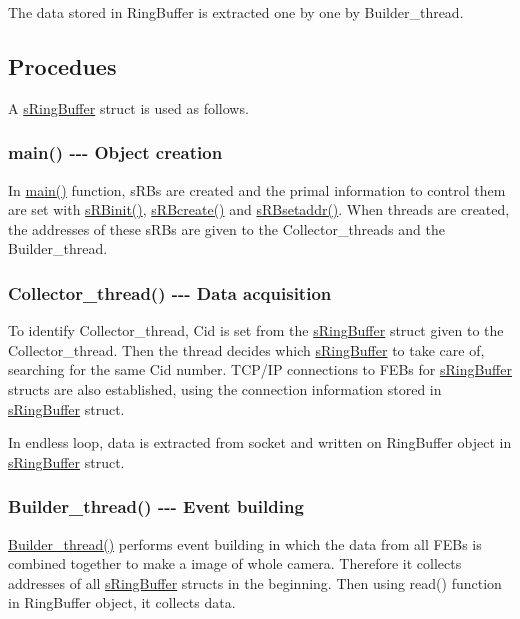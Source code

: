 The data stored in Ring\+Buffer is extracted one by one by Builder\+\_\+thread.\hypertarget{structsRingBuffer_SRB_PROC}{}\subsection{Procedues}\label{structsRingBuffer_SRB_PROC}
A \hyperlink{structsRingBuffer}{s\+Ring\+Buffer} struct is used as follows.\hypertarget{structsRingBuffer_SRB_CREATION}{}\subsubsection{main() -\/-\/-\/ Object creation}\label{structsRingBuffer_SRB_CREATION}
In \hyperlink{Master_8cpp_a3c04138a5bfe5d72780bb7e82a18e627}{main()} function, s\+R\+Bs are created and the primal information to control them are set with \hyperlink{Master_8cpp_afdfe90600cb22da97e4a38a3a7245c0d}{s\+R\+Binit()}, \hyperlink{Master_8cpp_a2bc96e14aff905cfba14c80aa9fc6bc1}{s\+R\+Bcreate()} and \hyperlink{Master_8cpp_add67bfd9f7cbc6a394d0d61a41e57ec5}{s\+R\+Bsetaddr()}. When threads are created, the addresses of these s\+R\+Bs are given to the Collector\+\_\+threads and the Builder\+\_\+thread.\hypertarget{structsRingBuffer_SRB_COLL}{}\subsubsection{Collector\+\_\+thread() -\/-\/-\/ Data acquisition}\label{structsRingBuffer_SRB_COLL}
To identify Collector\+\_\+thread, Cid is set from the \hyperlink{structsRingBuffer}{s\+Ring\+Buffer} struct given to the Collector\+\_\+thread. Then the thread decides which \hyperlink{structsRingBuffer}{s\+Ring\+Buffer} to take care of, searching for the same Cid number. T\+C\+P/\+IP connections to F\+E\+Bs for \hyperlink{structsRingBuffer}{s\+Ring\+Buffer} structs are also established, using the connection information stored in \hyperlink{structsRingBuffer}{s\+Ring\+Buffer} struct.

In endless loop, data is extracted from socket and written on Ring\+Buffer object in \hyperlink{structsRingBuffer}{s\+Ring\+Buffer} struct.\hypertarget{structsRingBuffer_SRB_BLD}{}\subsubsection{Builder\+\_\+thread() -\/-\/-\/ Event building}\label{structsRingBuffer_SRB_BLD}
\hyperlink{Master_8cpp_a435b26afa480ba18cbef3620d0eccee2}{Builder\+\_\+thread()} performs event building in which the data from all F\+E\+Bs is combined together to make a image of whole camera. Therefore it collects addresses of all \hyperlink{structsRingBuffer}{s\+Ring\+Buffer} structs in the beginning. Then using read() function in Ring\+Buffer object, it collects data. 

